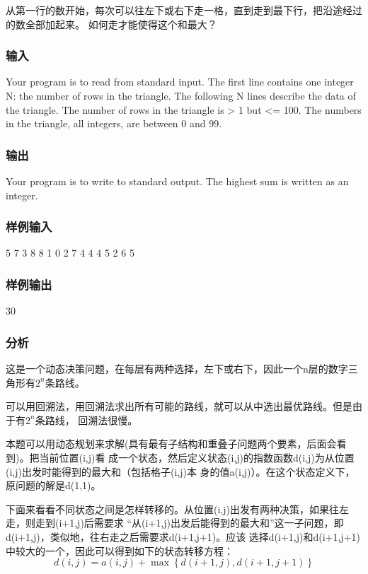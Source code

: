 从第一行的数开始，每次可以往左下或右下走一格，直到走到最下行，把沿途经过的数全部加起来。
如何走才能使得这个和最大？

\subsubsection{输入}
Your program is to read from standard input. The first line contains one integer N: the 
number of rows in the triangle. The following N lines describe the data of the triangle. 
The number of rows in the triangle is > 1 but <= 100. The numbers in the triangle, 
all integers, are between 0 and 99.

\subsubsection{输出}
Your program is to write to standard output. The highest sum is written as an integer.

\subsubsection{样例输入}
\begin{Code}
5
7
3 8 
8 1 0  
2 7 4 4 
4 5 2 6 5
\end{Code}

\subsubsection{样例输出}
\begin{Code}
30
\end{Code}

\subsubsection{分析}
这是一个动态决策问题，在每层有两种选择，左下或右下，因此一个n层的数字三角形有$2^n$条路线。

可以用回溯法，用回溯法求出所有可能的路线，就可以从中选出最优路线。但是由于有$2^n$条路线，
回溯法很慢。

本题可以用动态规划来求解(具有最有子结构和重叠子问题两个要素，后面会看到)。把当前位置(i,j)看
成一个状态，然后定义状态(i,j)的指数函数d(i,j)为从位置(i,j)出发时能得到的最大和（包括格子(i,j)本
身的值a(i,j)）。在这个状态定义下，原问题的解是d(1,1)。

下面来看看不同状态之间是怎样转移的。从位置(i,j)出发有两种决策，如果往左走，则走到(i+1,j)后需要求
“从(i+1,j)出发后能得到的最大和”这一子问题，即d(i+1,j)，类似地，往右走之后需要求d(i+1,j+1)。应该
选择d(i+1,j)和d(i+1,j+1)中较大的一个，因此可以得到如下的状态转移方程：
$$d(i,j)=a(i,j)+\max\left\{d(i+1,j), d(i+1,j+1)\right\}$$

